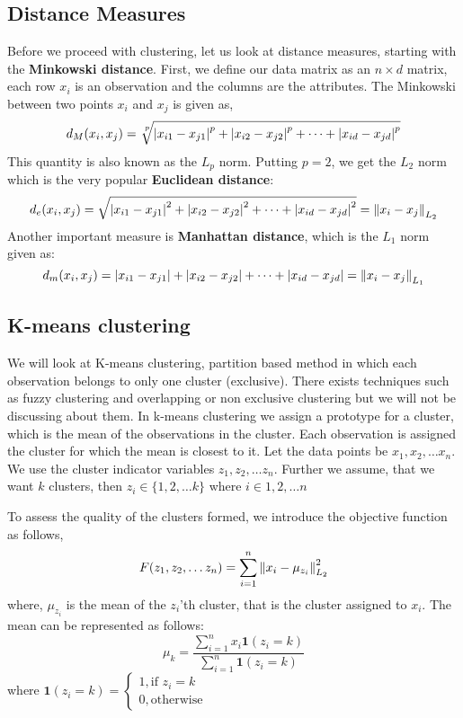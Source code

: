 \documentclass[12pt,a4paper]{article}
\begin{document}
\subsection{Distance Measures}
Before we proceed with clustering, let us look at distance measures, starting with the \textbf{Minkowski distance}. First, we define our data matrix as an $n \times d$ matrix, each row $x_i$ is an observation and the columns are the attributes. 
The Minkowski between two points $x_i$ and $x_j$ is given as,
$$d_{M}(x_i,x_j) = \sqrt[\leftroot{-2}\uproot{3}p]{ \abs{x_{i1}-x_{j1}}^p + \abs{x_{i2}-x_{j2}}^p + \dots + \abs{x_{id}-x_{jd}}^p}$$
This quantity is also known as the $L_p$ norm. Putting $p=2$, we get the $L_2$ norm which is the very popular \textbf{Euclidean distance}:
$$d_{e}(x_i,x_j) = \sqrt{ \abs{x_{i1}-x_{j1}}^2 + \abs{x_{i2}-x_{j2}}^2 + \dots + \abs{x_{id}-x_{jd}}^2} = \norm{x_i - x_j}_{L_2}$$
Another important measure is \textbf{Manhattan distance}, which is the $L_1$ norm given as:
$$d_{m}(x_i,x_j) = \abs{x_{i1}-x_{j1}} + \abs{x_{i2}-x_{j2}} + \dots + \abs{x_{id}-x_{jd}} = \norm{x_i - x_j}_{L_1}$$

\subsection{K-means clustering}
We will look at K-means clustering, partition based method in which each observation belongs to only one cluster (exclusive). There exists techniques such as fuzzy clustering and overlapping or non exclusive clustering but we will not be discussing about them.
In k-means clustering we assign a prototype for a cluster, which is the mean of the observations in the cluster. Each observation is assigned the cluster for which the mean is closest to it. Let the data points be $x_1, x_2, \dots x_n$. We use the cluster indicator variables $z_1, z_2, \dots z_n$. Further we assume, that we want $k$ clusters, then $z_i \in \{1,2, \dots k\}$ where $i \in {1,2, \dots n}$

To assess the quality of the clusters formed, we introduce the objective function as follows,
\begin{gather}
    F(z_1,z_2, \dots z_n) = \sum_{i=1}^{n} \norm{x_i - \mu_{z_{i}}}^{2}_{L_2}
\end{gather}
where, $\mu_{z_{i}}$ is the mean of the $z_i$'th cluster, that is the cluster assigned to $x_i$.
The mean can be represented as follows:
$$\mu_k = \dfrac{ \sum_{i=1}^{n} x_i \textbf{1}(z_i=k) }{ \sum_{i=1}^{n}\textbf{1}(z_i=k) }$$
where $\textbf{1}(z_i = k) = \begin{cases} 1, \text{if $z_i=k$}\\ 0, \text{otherwise} \end{cases}$
\end{document}
